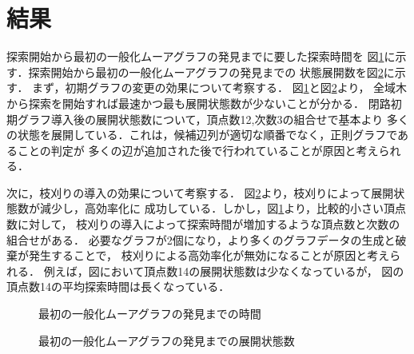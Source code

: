 \section{結果}
探索開始から最初の一般化ムーアグラフの発見までに要した探索時間を
図\ref{fig:time}に示す．探索開始から最初の一般化ムーアグラフの発見までの
状態展開数を図\ref{fig:state}に示す．
まず，初期グラフの変更の効果について考察する．
図\ref{fig:time}と図\ref{fig:state}より，
全域木から探索を開始すれば最速かつ最も展開状態数が少ないことが分かる．
閉路初期グラフ導入後の展開状態数について，頂点数12,次数3の組合せで基本より
多くの状態を展開している．これは，候補辺列が適切な順番でなく，正則グラフであることの判定が
多くの辺が追加された後で行われていることが原因と考えられる．

次に，枝刈りの導入の効果について考察する．
図\ref{fig:state}より，枝刈りによって展開状態数が減少し，高効率化に
成功している．しかし，図\ref{fig:time}より，比較的小さい頂点数に対して，
枝刈りの導入によって探索時間が増加するような頂点数と次数の組合せがある．
必要なグラフが2個になり，より多くのグラフデータの生成と破棄が発生することで，
枝刈りによる高効率化が無効になることが原因と考えられる．
例えば，図において頂点数14の展開状態数は少なくなっているが，
図の頂点数14の平均探索時間は長くなっている．

\begin{figure}
  \centering
  \noindent{}
  \caption{最初の一般化ムーアグラフの発見までの時間}
  \label{fig:time}
\end{figure}

\begin{figure}
  \centering
  \noindent{}
  \caption{最初の一般化ムーアグラフの発見までの展開状態数}
  \label{fig:state}
\end{figure}

